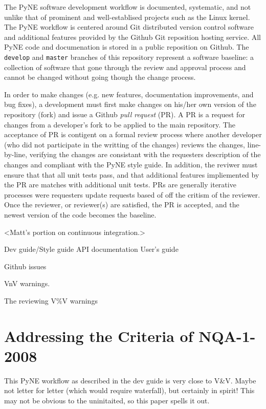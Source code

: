 \documentclass{anstrans}
\begin{document}
The PyNE software development workflow is documented, systematic, and not
unlike that of prominent and well-establised projects such as the Linux kernel.
The PyNE workflow is centered around Git distributed version control software
and additional features provided by the Github Git reposition hosting service.
All PyNE code and documenation is stored in a public reposition on Github. The
\texttt{develop} and \texttt{master} branches of this repository represent a
software baseline: a collection of software that gone through the review and
approval process and cannot be changed without going though the change process.

In order to make changes (e.g. new features, documentation improvements, and
bug fixes), a development must first make changes on his/her own version of the
repository (fork) and issue a Github \emph{pull request} (PR). A PR is a
request for changes from a developer's fork to be applied to the main
repository. The acceptance of PR is contigent on a formal review process where
another developer (who did not participate in the writting of the changes)
reviews the changes, line-by-line, verifying the changes are consistant with
the requesters description of the changes and compliant with the PyNE style
guide. In addition, the reviwer must ensure that that all unit tests pass, and
that additional features impliemented by the PR are matches with additional
unit tests. PRs are generally iterative processes were requesters update
requests based of off the critism of the reviewer. Once the reviewer, or
reviewer(s) are satisfied, the PR is accepted, and the newest version of the
code becomes the baseline.

<Matt's portion on continuous integration.>

Dev guide/Style guide
API documentation
User's guide

Github issues

VnV warnings.

The reviewing V\%V warnings 


\section{Addressing the Criteria of NQA-1-2008}

This PyNE workflow as described in the dev guide is very close to V\&V. Maybe not letter for letter (which would require waterfall), but certainly in spirit! 
This may not be obvious to the uninitaited, so this paper spells it out.
\end{document}
